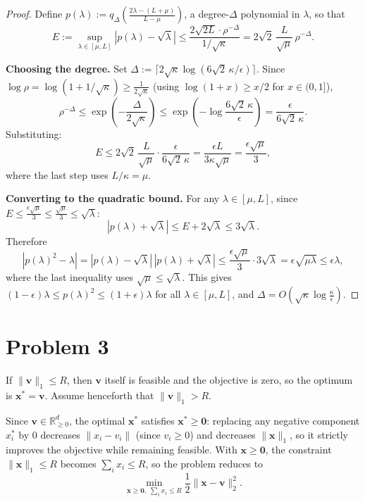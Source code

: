 \documentclass[12pt]{article}
\begin{document}
\begin{proof}
Define $p(\lambda) := q_\Delta\!\left(\frac{2\lambda - (L+\mu)}{L-\mu}\right)$, a degree-$\Delta$ polynomial in $\lambda$, so that
\[
    E := \sup_{\lambda \in [\mu,L]} |p(\lambda) - \sqrt{\lambda}| \leq \frac{2\sqrt{2L} \cdot \rho^{-\Delta}}{1/\sqrt{\kappa}} = 2\sqrt{2}\,\frac{L}{\sqrt{\mu}}\,\rho^{-\Delta}.
\]

\textbf{Choosing the degree.}
Set $\Delta := \lceil 2\sqrt{\kappa}\log(6\sqrt{2}\,\kappa/\epsilon)\rceil$. Since $\log\rho = \log(1 + 1/\sqrt{\kappa}) \geq \frac{1}{2\sqrt{\kappa}}$ (using $\log(1+x) \geq x/2$ for $x \in (0,1]$),
\[
    \rho^{-\Delta} \leq \exp\!\left(-\frac{\Delta}{2\sqrt{\kappa}}\right) \leq \exp\!\left(-\log\frac{6\sqrt{2}\,\kappa}{\epsilon}\right) = \frac{\epsilon}{6\sqrt{2}\,\kappa}.
\]
Substituting:
\[
    E \leq 2\sqrt{2}\,\frac{L}{\sqrt{\mu}} \cdot \frac{\epsilon}{6\sqrt{2}\,\kappa} = \frac{\epsilon L}{3\kappa\sqrt{\mu}} = \frac{\epsilon\sqrt{\mu}}{3},
\]
where the last step uses $L/\kappa = \mu$.

\textbf{Converting to the quadratic bound.}
For any $\lambda \in [\mu, L]$, since $E \leq \frac{\epsilon\sqrt{\mu}}{3} \leq \frac{\sqrt{\mu}}{3} \leq \sqrt{\lambda}$:
\[
    |p(\lambda) + \sqrt{\lambda}| \leq E + 2\sqrt{\lambda} \leq 3\sqrt{\lambda}.
\]
Therefore
\[
    |p(\lambda)^2 - \lambda| = |p(\lambda) - \sqrt{\lambda}|\,|p(\lambda) + \sqrt{\lambda}| \leq \frac{\epsilon\sqrt{\mu}}{3} \cdot 3\sqrt{\lambda} = \epsilon\sqrt{\mu\lambda} \leq \epsilon\lambda,
\]
where the last inequality uses $\sqrt{\mu} \leq \sqrt{\lambda}$. This gives $(1-\epsilon)\lambda \leq p(\lambda)^2 \leq (1+\epsilon)\lambda$ for all $\lambda \in [\mu, L]$, and $\Delta = O(\sqrt{\kappa}\log\frac{\kappa}{\epsilon})$.
\end{proof}

\section*{Problem 3}

If $\|\mathbf{v}\|_1 \leq R$, then $\mathbf{v}$ itself is feasible and the objective is zero, so the optimum is $\mathbf{x}^* = \mathbf{v}$. Assume henceforth that $\|\mathbf{v}\|_1 > R$.

Since $\mathbf{v} \in \mathbb{R}^d_{\geq 0}$, the optimal $\mathbf{x}^*$ satisfies $\mathbf{x}^* \geq \mathbf{0}$: replacing any negative component $x_i^*$ by $0$ decreases $\|x_i - v_i\|$ (since $v_i \geq 0$) and decreases $\|\mathbf{x}\|_1$, so it strictly improves the objective while remaining feasible. With $\mathbf{x} \geq \mathbf{0}$, the constraint $\|\mathbf{x}\|_1 \leq R$ becomes $\sum_i x_i \leq R$, so the problem reduces to
\[
\min_{\mathbf{x} \geq \mathbf{0},\; \sum_i x_i \leq R} \frac{1}{2}\|\mathbf{x} - \mathbf{v}\|_2^2.
\]
\end{document}
